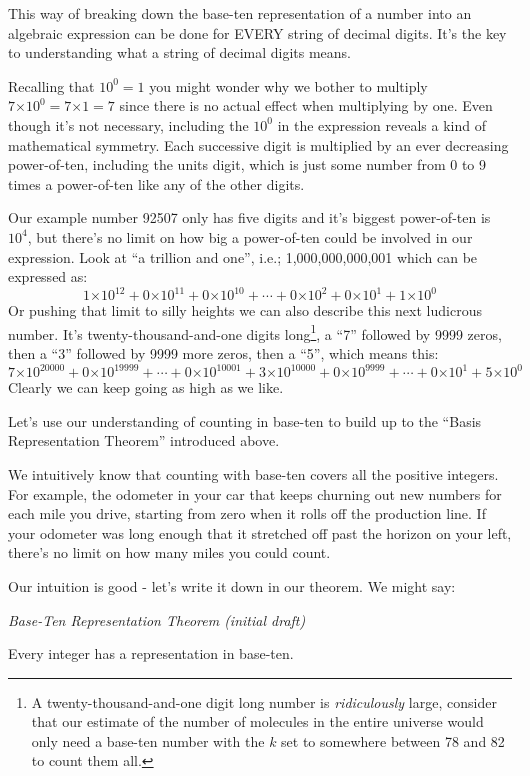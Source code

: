 \documentclass{article}
\newenvironment{jprIn}{\begin{adjustwidth}{2em}{}}{\end{adjustwidth}}
\begin{document}
This way of breaking down the base-ten representation of a number into
an algebraic expression can be done for EVERY string of decimal digits. It's the key to 
understanding what a string of decimal digits means.

Recalling that $10^0 = 1$ you might wonder why we bother to multiply
$7{\times{}}10^0=7{\times{}}1=7$ since there is no actual effect
when multiplying by one.
Even though it's not necessary, including the $10^0$ in the
expression reveals a kind of mathematical symmetry.
Each successive digit is multiplied by an ever
decreasing power-of-ten, including
the units digit,
which is just some number from 0 to 9 times a power-of-ten
like any of the other digits.

Our example number 92507 only has five digits and it's biggest power-of-ten is $10^4$,
but there's
no limit on how big a power-of-ten could be involved in our expression.
Look at ``a trillion and one'', i.e.; 1,000,000,000,001 which can be expressed as:
\[1{\times{}}10^{12}
+0{\times{}}10^{11}
+0{\times{}}10^{10}
+\cdots{}
+0{\times{}}10^{2}
+0{\times{}}10^{1}
+1{\times{}}10^{0}\]
%
Or pushing that limit to silly heights we can also describe this next ludicrous number.
It's twenty-thousand-and-one digits long\footnote{A twenty-thousand-and-one digit long number is 
\emph{ridiculously} large,
consider that our estimate of the number of molecules in
the entire universe would only need a base-ten
number with the $k$ set to somewhere between 78 and 82 to count them all.}, a
``7'' followed by 9999 zeros, then a ``3''
followed by 9999 more zeros, then a ``5'', which means this:
\[7{\times{}}10^{20000}
+0{\times{}}10^{19999}
+\cdots{}
+0{\times{}}10^{10001}
+3{\times{}}10^{10000}
+0{\times{}}10^{9999}
+\cdots{}
+0{\times{}}10^{1}
+5{\times{}}10^{0}\]
Clearly we can keep going as high as we like.

Let's use our understanding of counting in base-ten to build up to the
``Basis Representation Theorem'' introduced above.

We intuitively know that counting with
base-ten covers all the positive integers.
For example, the odometer in your car that keeps churning out
new numbers for each mile you drive, starting from zero when it rolls
off the production line.  If your odometer was long enough that it 
stretched off past the horizon on your left, there's no limit on
how many miles you could count.

Our intuition is good - let's write it down
in our theorem. We might say:

\emph{Base-Ten Representation Theorem (initial draft)}
\begin{jprIn}
Every integer has a representation in base-ten.
\end{jprIn}
\end{document}
